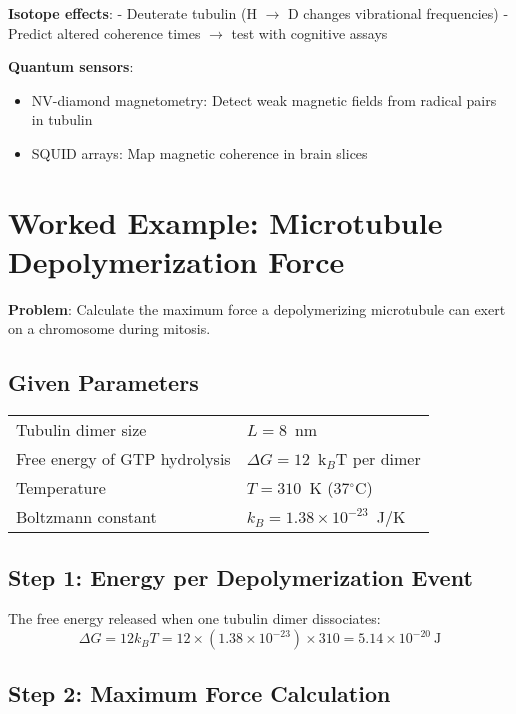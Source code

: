 \textbf{Isotope effects}: - Deuterate tubulin (H
$\rightarrow$ D changes vibrational frequencies) -
Predict altered coherence times $\rightarrow$ test with
cognitive assays

\textbf{Quantum sensors}:
\begin{itemize}
\item NV-diamond magnetometry: Detect weak
magnetic fields from radical pairs in tubulin
\item SQUID arrays: Map
magnetic coherence in brain slices
\end{itemize}


\section{Worked Example: Microtubule Depolymerization Force}
\label{sec:worked-example}

\textbf{Problem}: Calculate the maximum force a depolymerizing microtubule can exert on a chromosome during mitosis.

\subsection*{Given Parameters}

\begin{tabular}{@{}ll@{}}
Tubulin dimer size & $L = 8$~nm \\
Free energy of GTP hydrolysis & $\Delta G = 12$~k$_B$T per dimer \\
Temperature & $T = 310$~K (37$^\circ$C) \\
Boltzmann constant & $k_B = 1.38 \times 10^{-23}$~J/K \\
\end{tabular}

\subsection*{Step 1: Energy per Depolymerization Event}

The free energy released when one tubulin dimer dissociates:
\begin{equation}
\Delta G = 12 k_B T = 12 \times (1.38 \times 10^{-23}) \times 310 = 5.14 \times 10^{-20}~\text{J}
\label{eq:delta-g}
\end{equation}

\subsection*{Step 2: Maximum Force Calculation}

